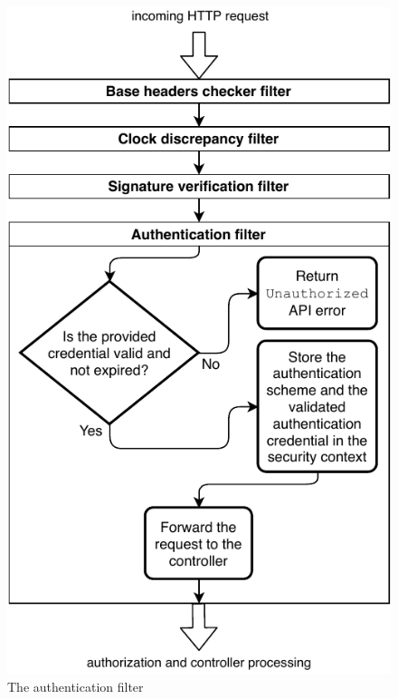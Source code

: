 \begin{figure}[!htb]
    \includegraphics[width=\textwidth]{figures/authentication-filter.pdf}
    \caption{The authentication filter}
    \label{fig:authentication-filter}
\end{figure}


